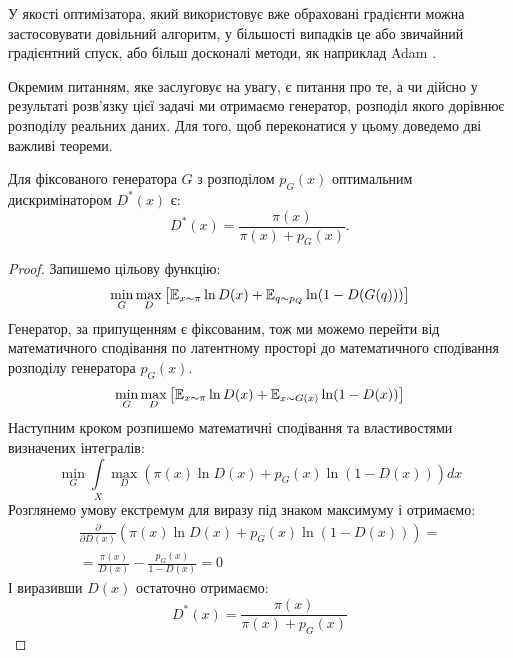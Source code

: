 У якості оптимізатора, який використовує вже обраховані градієнти
можна застосовувати довільний алгоритм, у більшості випадків це або
звичайний градієнтний спуск,
або більш досконалі методи, як наприклад
Adam \cite{kingma2014adam}.

Окремим питанням, яке заслуговує на увагу, є питання про те,
а чи дійсно у результаті розв'язку цієї задачі ми отримаємо
генератор, розподіл якого дорівнює розподілу реальних даних.
Для того, щоб переконатися у цьому доведемо дві важливі теореми.

\begin{theorem}
    Для фіксованого генератора $G$ з розподілом $p_G(x)$
    оптимальним дискримінатором $D^*(x)$ є:
    \begin{equation*}
        D^{*}(x) = \frac{\pi(x)}{\pi(x) + p_G(x)}.
    \end{equation*}
\end{theorem}
\begin{proof}
    Запишемо цільову функцію:
    \begin{equation*}
        \min\limits_{G}\max\limits_{D} \left[
            \operatorname{\mathbb{E}}_{x \sim \pi} \ln D(x) +
            \operatorname{\mathbb{E}}_{q \sim p_{Q}} \ln (1 - D(G(q))) \right]
    \end{equation*}
    Генератор, за припущенням є фіксованим, тож ми можемо перейти
    від математичного сподівання по латентному просторі до математичного сподівання
    розподілу генератора $p_G(x)$.
    \begin{equation*}
        \min\limits_{G}\max\limits_{D} \left[
            \operatorname{\mathbb{E}}_{x \sim \pi} \ln D(x) +
            \operatorname{\mathbb{E}}_{x \sim G(x)} \ln (1 - D(x)) \right]
    \end{equation*}
    Наступним кроком розпишемо математичні сподівання та
    властивостями визначених інтегралів:
    \begin{equation*}
        \min\limits_{G} \int\limits_X \max\limits_{D}
        \left( \pi(x) \ln D(x) +
        p_G(x) \ln (1 - D(x)) \right) dx
    \end{equation*}
    Розглянемо умову екстремум для виразу під
    знаком максимуму і отримаємо:
    \begin{gather*}
        \frac{\partial}{\partial D(x)}
        \left( \pi(x) \ln D(x) +
        p_G(x) \ln (1 - D(x)) \right) = \\
        = \frac{\pi(x)}{D(x)} - \frac{p_G(x)}{1 - D(x)} = 0
    \end{gather*}
    І виразивши $D(x)$ остаточно отримаємо:
    \begin{equation*}
        D^{*}(x) = \frac{\pi(x)}{\pi(x) + p_G(x)}
    \end{equation*}
\end{proof}

